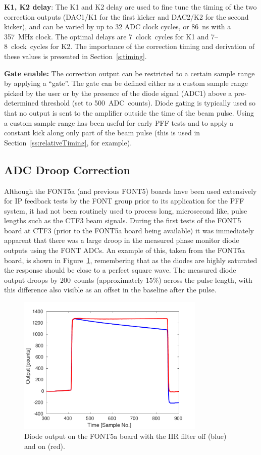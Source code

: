 \textbf{K1, K2 delay}: The K1 and K2 delay are used to fine tune the timing of the two correction outputs (DAC1/K1 for the first kicker and DAC2/K2 for the second kicker), and can be varied by up to 32 ADC clock cycles, or 86~ns with a 357~MHz clock. The optimal delays are 7~clock~cycles for K1 and 7--8~clock~cycles for K2. The importance of the correction timing and derivation of these values is presented in Section~\ref{s:timing}.

\textbf{Gate enable:} The correction output can be restricted to a certain sample range by applying a ``gate''. The gate can be defined either as a custom sample range picked by the user or by the presence of the diode signal (ADC1) above a pre-determined threshold (set to 500~ADC~counts). Diode gating is typically used so that no output is sent to the amplifier outside the time of the beam pulse. Using a custom sample range has been useful for early PFF tests and to apply a constant kick along only part of the beam pulse (this is used in Section~\ref{ss:relativeTiming}, for example).


\subsection{ADC Droop Correction}
\label{ss:droopCorr}

Although the FONT5a (and previous FONT5) boards have been used extensively for IP feedback tests by the FONT group prior to its application for the PFF system, it had not been routinely used to process long, microsecond like, pulse lengths such as the CTF3 beam signals. During the first tests of the FONT5 board at CTF3 (prior to the FONT5a board being available) it was immediately apparent that there was a large droop in the measured phase monitor diode outputs using the FONT ADCs. An example of this, taken from the FONT5a board, is shown in Figure~\ref{f:iirDiodefiltOffOn}, remembering that as the diodes are highly saturated the response should be close to a perfect square wave. The measured diode output droops by 200~counts (approximately 15\%) across the pulse length, with this difference also visible as an offset in the baseline after the pulse.

\begin{figure}
  \centering
  \includegraphics[width=0.8\textwidth]{Figures/commissioning/iirDiodeFiltOffOn}
  \caption{Diode output on the FONT5a board with the IIR filter off (blue) and on (red).}
  \label{f:iirDiodefiltOffOn}
\end{figure}

